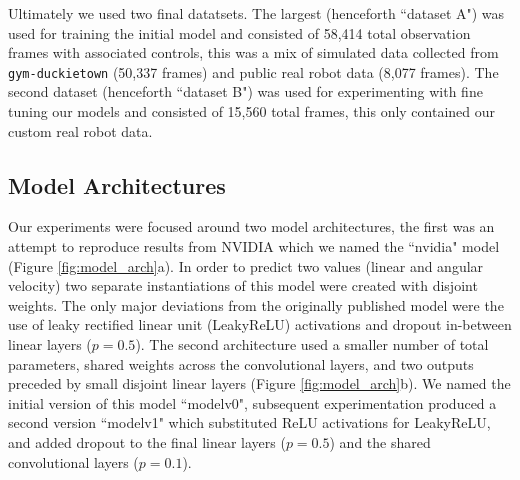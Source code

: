 \documentclass{article}
\begin{document}
Ultimately we used two final datatsets. The largest (henceforth ``dataset A") was used for training the initial model and consisted of 58,414 total observation frames with associated controls, this was a mix of simulated data collected from \texttt{gym-duckietown} (50,337 frames) and public real robot data (8,077 frames). The second dataset (henceforth ``dataset B") was used for experimenting with fine tuning our models and consisted of 15,560 total frames, this only contained our custom real robot data.

\subsection{Model Architectures} \label{sec:model_arch}

    Our experiments were focused around two model architectures, the first was an attempt to reproduce results from NVIDIA \cite{DBLP:journals/corr/BojarskiTDFFGJM16} which we named the ``nvidia" model (Figure \ref{fig:model_arch}a). In order to predict two values (linear and angular velocity) two separate instantiations of this model were created with disjoint weights. The only major deviations from the originally published model were the use of leaky rectified linear unit (LeakyReLU) activations and dropout in-between linear layers ($p=0.5$).
    The second architecture used a smaller number of total parameters, shared weights across the convolutional layers, and two outputs preceded by small disjoint linear layers (Figure \ref{fig:model_arch}b). We named the initial version of this model ``modelv0", subsequent experimentation produced a second version ``modelv1" which substituted ReLU activations for LeakyReLU, and added dropout to the final linear layers ($p=0.5$) and the shared convolutional layers ($p=0.1$).
\end{document}

